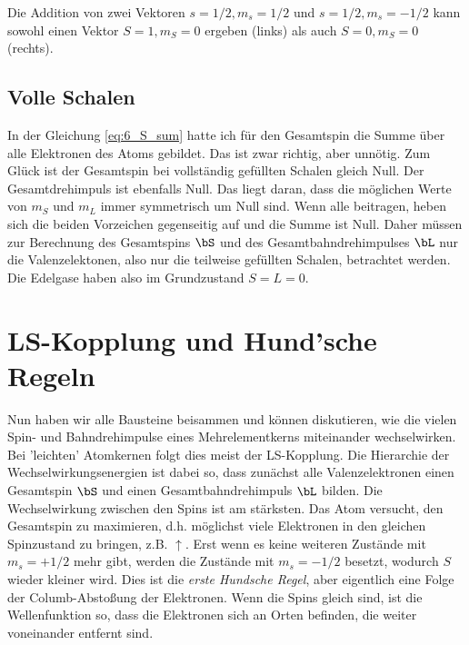 \begin{marginfigure}

\caption{Die Addition von zwei Vektoren $s=1/2, m_s = 1/2$ und  $s=1/2, m_s = -1/2$ kann sowohl einen Vektor   $S=1, m_S = 0$ ergeben (links) als auch $S=0, m_S = 0$ (rechts).}
\end{marginfigure}

\subsection{Volle Schalen}

In der Gleichung \ref{eq:6_S_sum} hatte ich für den Gesamtspin die Summe über alle Elektronen des Atoms gebildet. Das ist zwar richtig, aber unnötig. Zum Glück ist der Gesamtspin bei vollständig gefüllten Schalen gleich Null. Der Gesamtdrehimpuls ist ebenfalls Null. Das liegt daran, dass die möglichen Werte von $m_S$ und $m_L$ immer symmetrisch um Null sind. Wenn alle beitragen, heben sich die beiden Vorzeichen gegenseitig auf und die Summe ist Null. Daher müssen zur Berechnung des Gesamtspins $\bS$ und des Gesamtbahndrehimpulses $\bL$ nur die Valenzelektonen, also nur die teilweise gefüllten Schalen, betrachtet werden. Die Edelgase haben also im Grundzustand $S=L=0$.


\section{LS-Kopplung und Hund'sche Regeln}

Nun haben wir alle Bausteine beisammen und können diskutieren, wie die vielen Spin- und Bahndrehimpulse eines Mehrelementkerns miteinander wechselwirken. Bei 'leichten' Atomkernen folgt dies meist der LS-Kopplung. Die Hierarchie der Wechselwirkungsenergien ist dabei so, dass zunächst alle Valenzelektronen einen Gesamtspin $\bS$ und einen Gesamtbahndrehimpuls $\bL$ bilden. Die Wechselwirkung zwischen den Spins ist am stärksten. Das Atom versucht, den Gesamtspin zu maximieren, d.h. möglichst viele Elektronen in den gleichen Spinzustand zu bringen, z.B. $\uparrow$. Erst wenn es keine weiteren Zustände mit $m_s = +1/2$ mehr gibt, werden die Zustände mit $m_s = -1/2$ besetzt, wodurch $S$ wieder kleiner wird. Dies ist die \emph{erste Hundsche Regel}, aber eigentlich eine Folge der Columb-Abstoßung der Elektronen. Wenn die Spins gleich sind, ist die Wellenfunktion so, dass die Elektronen sich an Orten befinden, die weiter voneinander entfernt sind.

